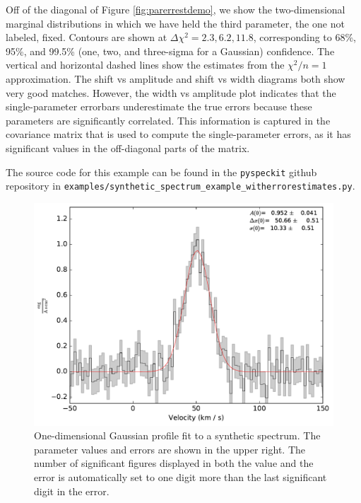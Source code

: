 \documentclass[twocolumn]{aastex62}
\newcommand{\pyspeckit}{\texttt{pyspeckit}\xspace}
\begin{document}
Off of the diagonal of Figure \ref{fig:parerrestdemo}, we show the
two-dimensional marginal distributions in which we have held the third
parameter, the one not labeled, fixed.  Contours are shown at
$\Delta\chi^2=2.3,6.2,11.8$, corresponding to 68\%, 95\%, and 99.5\% (one, two,
and three-sigma for a Gaussian) confidence.
The vertical and horizontal dashed lines show the estimates from the $\chi^2/n=1$
approximation.
The shift vs amplitude and shift vs width diagrams both show very good matches.
However, the width vs amplitude plot indicates that the single-parameter
errorbars underestimate the true errors because these parameters are
significantly correlated.  This information is captured in the covariance
matrix that is used to compute the single-parameter errors, as it has
significant values in the off-diagonal parts of the matrix.

The source code for this example can be found in the \pyspeckit github
repository in \texttt{examples/synthetic\_spectrum\_example\_witherrorestimates.py}.

\begin{figure}[!htp]
\includegraphics[scale=1,width=7in]{oned_gaussfit_example.pdf}
\caption{One-dimensional Gaussian profile fit to a synthetic spectrum.
The parameter values and errors are shown in the upper right.  The number of
significant figures displayed in both the value and the error is automatically
set to one digit more than the last significant digit in the error.}
\label{fig:synthspecdemo}
\end{figure}
\end{document}
